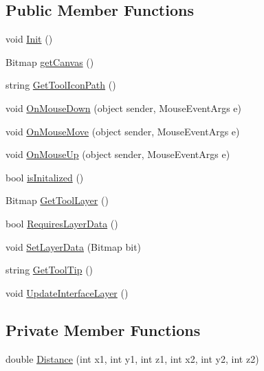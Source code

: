 \subsection*{Public Member Functions}
\begin{DoxyCompactItemize}
\item 
void \mbox{\hyperlink{class_paint___program_1_1_green_screen_tool_a957c8149c7cc59b1c9734ca5bb5309c7}{Init}} ()
\item 
Bitmap \mbox{\hyperlink{class_paint___program_1_1_green_screen_tool_a883b61f098ace3dc87b8ad92b59fcb6c}{get\+Canvas}} ()
\item 
string \mbox{\hyperlink{class_paint___program_1_1_green_screen_tool_a5d25a6867cc4882d9ec31182829fb24b}{Get\+Tool\+Icon\+Path}} ()
\item 
void \mbox{\hyperlink{class_paint___program_1_1_green_screen_tool_ae3a5e35c0921093957b7cccde92e1b91}{On\+Mouse\+Down}} (object sender, Mouse\+Event\+Args e)
\item 
void \mbox{\hyperlink{class_paint___program_1_1_green_screen_tool_a95699606ba5027c0671f4bc6ef86be93}{On\+Mouse\+Move}} (object sender, Mouse\+Event\+Args e)
\item 
void \mbox{\hyperlink{class_paint___program_1_1_green_screen_tool_ad6be969ae981c34f5677e8a5bd537ef6}{On\+Mouse\+Up}} (object sender, Mouse\+Event\+Args e)
\item 
bool \mbox{\hyperlink{class_paint___program_1_1_green_screen_tool_a94a122c3229b5f530531228837234eb0}{is\+Initalized}} ()
\item 
Bitmap \mbox{\hyperlink{class_paint___program_1_1_green_screen_tool_a02fd2ecf253f8eeb746d1e78eedb08a2}{Get\+Tool\+Layer}} ()
\item 
bool \mbox{\hyperlink{class_paint___program_1_1_green_screen_tool_a554c35de10b5876aa936961177344a59}{Requires\+Layer\+Data}} ()
\item 
void \mbox{\hyperlink{class_paint___program_1_1_green_screen_tool_ad17100eea4bbfc96072cf4525ea053c4}{Set\+Layer\+Data}} (Bitmap bit)
\item 
string \mbox{\hyperlink{class_paint___program_1_1_green_screen_tool_af580394652e180ac8f0acfb79704ffa4}{Get\+Tool\+Tip}} ()
\item 
void \mbox{\hyperlink{class_paint___program_1_1_green_screen_tool_a3d474370bf269af763ff6edceebd2000}{Update\+Interface\+Layer}} ()
\end{DoxyCompactItemize}
\subsection*{Private Member Functions}
\begin{DoxyCompactItemize}
\item 
double \mbox{\hyperlink{class_paint___program_1_1_green_screen_tool_a5da8c478fc4640e8250f1186b2ae8f74}{Distance}} (int x1, int y1, int z1, int x2, int y2, int z2)
\end{DoxyCompactItemize}
